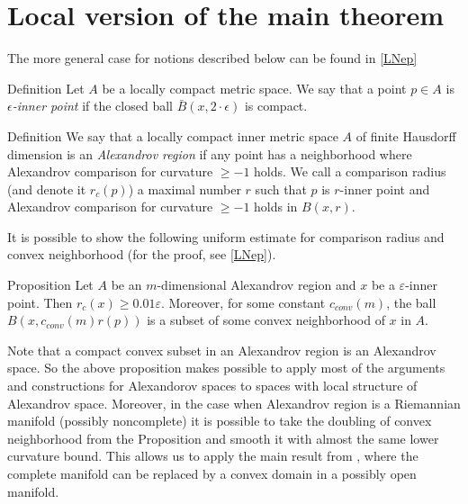 \section{Local version of the main theorem}\label{sec:local}

The more general case for
notions described below can be found in
\ref{LNep}

\begin{rdef}{Definition}
Let $A$ be a locally compact metric space. 
We say that a point  $p\in A$
is  \emph{ $\epsilon$-inner point} if
the closed ball $\bar B(x,2\cdot\epsilon)$ is compact.

\end{rdef}

\begin{rdef}{Definition}
We say that
 a locally compact inner metric space $A$ of finite Hausdorff dimension
is an \emph{ Alexandrov region} if
any point has a neighborhood where Alexandrov
comparison for curvature $\ge -1$ holds.
We call a comparison 
radius (and denote it $r_c(p)$) a maximal number $r$ such that
$p$ is $r$-inner point and 
 Alexandrov
comparison for curvature $\ge -1$ holds in
$B(x,r)$.


\end{rdef}
It is possible to show the following uniform estimate for
comparison radius and convex neighborhood (for the proof, see \ref{LNep}).

\begin{thm}{Proposition}
Let $A$ be an $m$-dimensional Alexandrov region
and $x$ be a $\varepsilon$-inner
point. Then 
 $r_c(x)\ge 0.01\varepsilon$.
Moreover,  for some constant $c_{conv}(m)$,
the ball $B(x, c_{conv}(m)r(p))$ is a subset of some
convex
neighborhood of $x$ in $A$.

\end{thm}

Note that a compact convex subset in an Alexandrov region is an Alexandrov space.
So the above proposition
makes possible 
to apply most of the arguments and constructions for Alexandorov spaces to
spaces
  with local structure of Alexandrov space. 
  Moreover, in the case when Alexandrov region
  is a Riemannian 
manifold (possibly noncomplete) it is possible
to take the doubling of convex neighborhood from the Proposition
and smooth it with almost the same lower curvature bound.
This allows us to apply the main result from
 \cite{petrunin-SC}, where the complete manifold can be replaced by a convex domain  in a possibly open manifold. 

